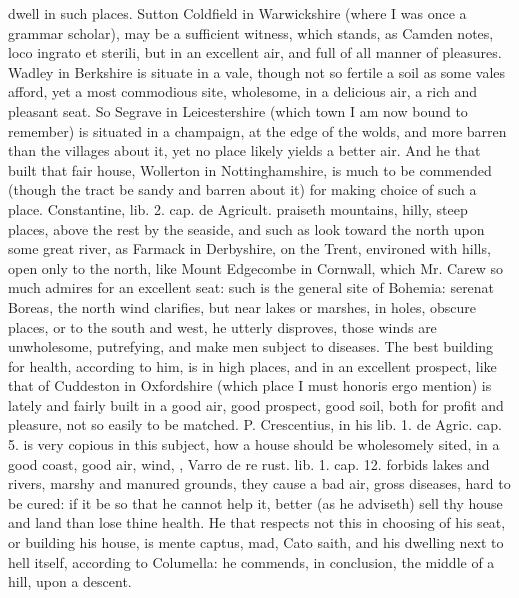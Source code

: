 {dwell in such places. Sutton \label{mention:coldfield}Coldfield in Warwickshire (where I was
once a grammar scholar), may be a sufficient witness, which stands, as
Camden notes, loco ingrato et sterili, but in an excellent air, and
full of all manner of pleasures. Wadley in Berkshire is situate
in a vale, though not so fertile a soil as some vales afford, yet a
most commodious site, wholesome, in a delicious air, a rich and
pleasant seat. So Segrave in Leicestershire (which town I am now
bound to remember) is situated in a champaign, at the edge of the
wolds, and more barren than the villages about it, yet no place likely
yields a better air. And he that built that fair house, Wollerton
in Nottinghamshire, is much to be commended (though the tract be sandy
and barren about it) for making choice of such a place. Constantine,
lib. 2. cap. de Agricult. praiseth mountains, hilly, steep places,
above the rest by the seaside, and such as look toward the north
upon some great river, as  Farmack in Derbyshire, on the Trent,
environed with hills, open only to the north, like Mount Edgecombe in
Cornwall, which Mr. Carew so much admires for an excellent seat:
such is the general site of Bohemia: serenat Boreas, the north wind
clarifies, but near lakes or marshes, in holes, obscure places,
or to the south and west, he utterly disproves, those winds are
unwholesome, putrefying, and make men subject to diseases. The best
building for health, according to him, is in  high places, and in
an excellent prospect, like that of Cuddeston in Oxfordshire (which
place I must honoris ergo mention) is lately and fairly built in
a good air, good prospect, good soil, both for profit and pleasure, not
so easily to be matched. P. Crescentius, in his lib. 1. de Agric. cap.
5. is very copious in this subject, how a house should be wholesomely
sited, in a good coast, good air, wind, \etc{}, Varro de re rust. lib. 1.
cap. 12. forbids lakes and rivers, marshy and manured grounds,
they cause a bad air, gross diseases, hard to be cured: if it be
so that he cannot help it, better (as he adviseth) sell thy house and
land than lose thine health. He that respects not this in choosing of
his seat, or building his house, is mente captus, mad, Cato
saith, and his dwelling next to hell itself, according to Columella: he
commends, in conclusion, the middle of a hill, upon a descent.
}
